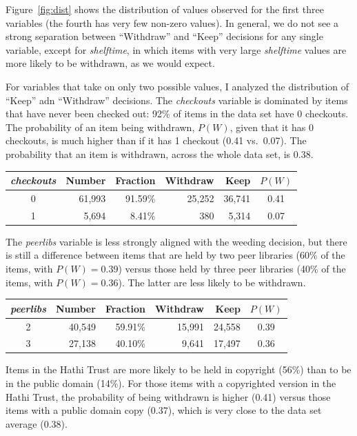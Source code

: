 \documentclass[man,11pt]{apa6}
\begin{document}
Figure~\ref{fig:dist} shows the distribution of values observed for
the first three variables (the fourth has very few non-zero values).
In general, we do not see a strong separation between ``Withdraw'' and
``Keep'' decisions for any single variable, except for {\em
  shelftime}, in which items with very large {\em shelftime} values
are more likely to be withdrawn, as we would expect.

For variables that take on only two possible values, I analyzed the
distribution of ``Keep'' adn ``Withdraw'' decisions.
%
The {\em checkouts} variable is dominated by items that have never
been checked out: 92\% of items in the data set have 0 checkouts.
The probability of an item being withdrawn, $P(W)$, given that it has
0 checkouts, is much higher than if it has 1 checkout (0.41 vs.~0.07).
The probability that an item is withdrawn, across the whole data set,
is 0.38. 

\singlespacing
\begin{center}
\begin{tabular}{|c|rr|rr|c|}
\hline
{\em checkouts} & Number & Fraction & Withdraw & Keep & $P(W)$\\ \hline
0 & 61,993 & 91.59\% & 25,252 & 36,741 & 0.41 \\
1 &  5,694 &  8.41\% &    380 &  5,314 & 0.07 \\
\hline
\end{tabular}
\end{center}
\doublespacing

The {\em peerlibs} variable is less strongly aligned with the weeding
decision, but there is still a difference between items that are held
by two peer libraries (60\% of the items, with $P(W) = 0.39$) versus
those held by three peer libraries (40\% of the items, with $P(W) =
0.36$).  The latter are less likely to be withdrawn.

\singlespacing
\begin{center}
\begin{tabular}{|c|rr|rr|c|}
\hline
{\em peerlibs} & Number & Fraction & Withdraw & Keep & $P(W)$\\ \hline
2 & 40,549 & 59.91\% & 15,991 & 24,558 & 0.39 \\
3 & 27,138 & 40.10\% &  9,641 & 17,497 & 0.36 \\
\hline
\end{tabular}
\end{center}
\doublespacing

Items in the Hathi Trust are more likely to be held in copyright
(56\%) than to be in the public domain (14\%).  For those items with a
copyrighted version in the Hathi Trust, the probability of being
withdrawn is higher (0.41) versus those items with a public domain
copy (0.37), which is very close to the data set average (0.38). 
\end{document}
